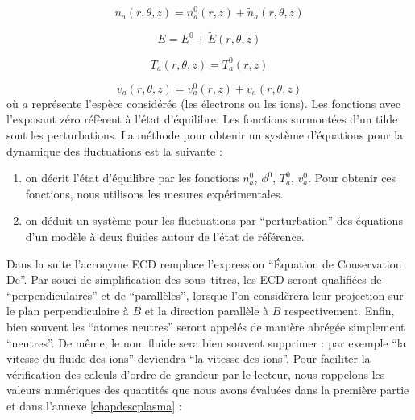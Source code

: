 \documentclass{book}
\begin{document}
\begin{equation}
n_a(r,\theta,z)=n_a^0(r,z)+\tilde{n}_a(r,\theta,z)
\end{equation}
 
\begin{equation}
E=E^0+\tilde{E}(r,\theta,z)
\end{equation}

\begin{equation}
T_a(r,\theta,z)=T_a^0(r,z)
\end{equation}

\begin{equation}
v_a(r,\theta,z)=v_a^0(r,z)+\tilde{v}_a(r,\theta,z)
\end{equation}
o\`u $a$
repr\'esente l'esp\`ece consid\'er\'ee (les 
\'electrons ou les ions). Les fonctions avec l'exposant z\'ero
r\'ef\`erent \`a l'\'etat d'\'equilibre. Les fonctions surmont\'ees
d'un tilde sont les perturbations.
La m\'ethode pour obtenir un syst\`eme d'\'equations pour la dynamique
des fluctuations est la suivante :
\begin{enumerate}
\item on d\'ecrit l'\'etat d'\'equilibre par les fonctions $n_a^0$,
$\phi^0$, $T_a^0$, $v_a^0$. Pour obtenir ces fonctions, nous utilisons
les mesures exp\'erimentales.
\item on d\'eduit un syst\`eme pour les fluctuations par
``perturbation'' des \'equations d'un mod\`ele \`a deux fluides
autour de l'\'etat de r\'ef\'erence.
\end{enumerate}



Dans la suite l'acronyme ECD remplace l'expression ``\'Equation de
Conservation De''.
 Par souci de simplification des sous--titres, les ECD
seront qualifi\'ees de  ``perpendiculaires'' et de  ``parall\`eles'',
lorsque l'on consid\`erera leur projection sur le plan perpendiculaire
\`a $B$ et la direction parall\`ele \`a $B$ respectivement.
Enfin, bien souvent les ``atomes neutres'' seront
appel\'es de mani\`ere abr\'eg\'ee simplement ``neutres''. De m\^eme,
le nom fluide sera bien souvent supprimer : par exemple ``la vitesse
du fluide des ions'' deviendra ``la vitesse des ions''.
Pour faciliter la v\'erification des calculs d'ordre de grandeur par
le lecteur, nous rappelons les valeurs num\'eriques des quantit\'es
que nous avons \'evalu\'ees dans la premi\`ere partie et dans l'annexe
\ref{chapdescplasma} :
\end{document}
